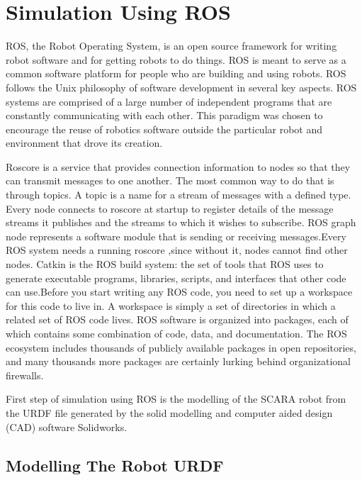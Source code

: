 \documentclass[a4paper,12pt,one side]{report}%
\begin{document}


\chapter{Simulation Using ROS}
\par ROS, the Robot Operating System, is an open source framework for writing robot
software and for getting robots to do things. ROS is meant to serve as a common
software platform for people who are building and using robots. ROS follows the
Unix philosophy of software development in several key aspects. ROS systems
are comprised of a large number of independent programs that are constantly
communicating with each other. This paradigm was chosen to encourage the reuse
of robotics software outside the particular robot and environment that drove its
creation.

\par Roscore is a service that provides connection information to nodes so that they
can transmit messages to one another. The most common way to do that is
through topics. A topic is a name for a stream of messages with a defined
type. Every node connects to roscore at startup to register details of the message
streams it publishes and the streams to which it wishes to subscribe. ROS graph
node represents a software module that is sending or receiving messages.Every
ROS system needs a running roscore ,since without it, nodes cannot find other
nodes. Catkin is the ROS build system: the set of tools that ROS uses to
generate executable programs, libraries, scripts, and interfaces that other code
can use.Before you start writing any ROS code, you need to set up a workspace for this code to live in. A workspace is simply a set of directories in which a
related set of ROS code lives. ROS software is organized into packages, each of
which contains some combination of code, data, and documentation. The ROS
ecosystem includes thousands of publicly available packages in open repositories,
and many thousands more packages are certainly lurking behind organizational
firewalls.
\par First step of simulation using ROS is the modelling of the SCARA robot from the
URDF file generated by the solid modelling and computer aided design (CAD)
software Solidworks.

\section{Modelling The Robot URDF}
\end{document}
